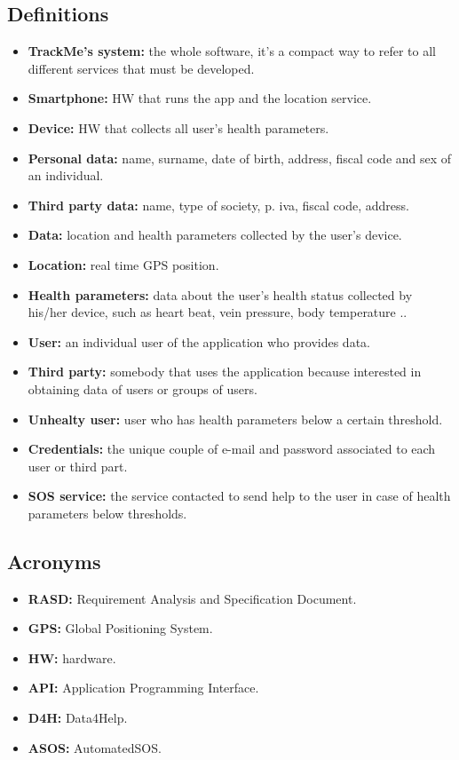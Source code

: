 \subsection{Definitions}
	\begin{itemize}
		\item{\textbf{TrackMe's system:} the whole software, it's a compact way to refer to all different services that must be 					developed.}

		\item {\textbf{Smartphone:} HW that runs the app and the location service.}
		\item {\textbf{Device:} HW that collects all user's health parameters.}

		\item {\textbf{Personal data:} name, surname, date of birth, address, fiscal code and sex of an individual.}
		\item {\textbf{Third party data:} name, type of society, p. iva, fiscal code, address.}
		\item {\textbf{Data:} location and health parameters collected by the user's device.}
		\item {\textbf{Location:} real time GPS position.}
		\item {\textbf{Health parameters:} data about the user's health status collected by his/her device, such as heart beat, 						vein pressure, body temperature ..}

		\item {\textbf{User:} an individual user of the application who provides data.}
		\item {\textbf{Third party:} somebody that uses the application because interested in obtaining data of users or groups of users.} 
		\item {\textbf{Unhealty user:} user who has health parameters below a certain threshold.}
		\item {\textbf{Credentials:} the unique couple of e-mail and password associated to each user or third part.}

		\item{\textbf{SOS service:} the service contacted to send help to the user in case of health parameters below thresholds.}
	\end {itemize}

\subsection{Acronyms}
	\begin{itemize}
		\item {\textbf {RASD:} Requirement Analysis and Specification Document.}
		\item {\textbf {GPS:} Global Positioning System.}
		\item {\textbf {HW:} hardware.}
		\item {\textbf {API:} Application Programming Interface.}
		\item {\textbf {D4H:} Data4Help.} 
		\item {\textbf {ASOS:} AutomatedSOS.}
	\end{itemize}

